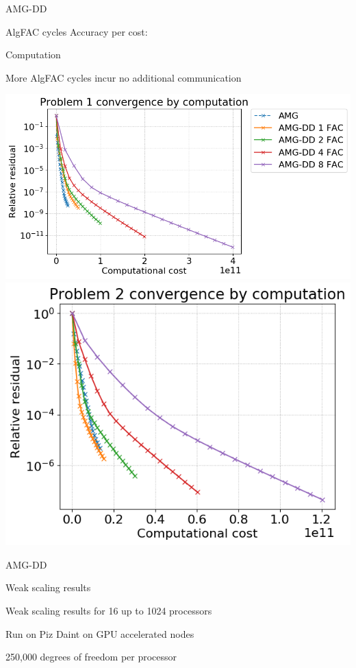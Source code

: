 \documentclass[18pt,xcolor=table]{beamer}
\begin{document}
\begin{frame}{AMG-DD}
\begin{block}{AlgFAC cycles}
Accuracy per cost:
\bit
   \item Computation
   \item More AlgFAC cycles incur no additional communication
\eit
\end{block}
\centering
\vspace{0.5 cm}
\includegraphics[height=0.3\textwidth]{../figures/resConvNumFACByComputationProblem1}
\includegraphics[height=0.3\textwidth]{../figures/resConvNumFACByComputationProblem2}
\end{frame}

\begin{frame}{AMG-DD}
\begin{block}{Weak scaling results}
\bit
\item Weak scaling results for 16 up to 1024 processors
\item Run on Piz Daint on GPU accelerated nodes
\item 250,000 degrees of freedom per processor
\eit
\end{block}
\end{frame}
\end{document}
